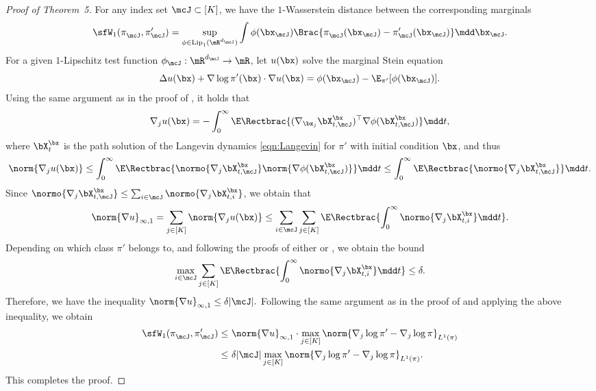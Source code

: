 \documentclass[11pt]{article}
\newcommand{\Lip}{{\rm Lip}}
\begin{document}
\begin{proof}[Proof of Theorem~5]
For any index set $\mcJ\subset [K]$, we have the $1$-Wasserstein distance between the corresponding marginals
\begin{equation}
    \sfW_1(\pi_\mcJ^{},\pi_\mcJ') = \sup_{\phi \in \Lip_1(\mR^{d_\mcJ})} \int \phi(\bx_\mcJ) \Brac{ \pi_\mcJ^{}(\bx_\mcJ) - \pi_\mcJ' (\bx_\mcJ) } \mdd \bx_\mcJ.
\end{equation}
For a given $1$-Lipschitz test function $\phi_\mcJ : \mR^{d_\mcJ} \rightarrow \mR$, let $u(\bx)$ solve the marginal Stein equation
\begin{equation}
    \Delta u(\bx) + \nabla \log \pi' (\bx) \cdot \nabla u(\bx) = \phi(\bx_\mcJ) - \E_{\pi'} [\phi(\bx_\mcJ)].  
\end{equation}
Using the same argument as in the proof of , it holds that
\begin{equation} 
    \nabla_j u(\bx) = - \int_0^\infty \E \Rectbrac{ (\nabla_{\bx_j} \bX_{t,\mcJ}^\bx)^\top \nabla \phi (\bX_{t,\mcJ}^\bx) } \mdd t,
\end{equation}
where $\bX_t^\bx$ is the path solution of the Langevin dynamics \eqref{eqn:Langevin} for $\pi'$ with initial condition $\bx$, and thus
\begin{equation}
    \norm{ \nabla_j u(\bx) } \le \int_0^\infty \E \Rectbrac{ \normo{ \nabla_j \bX_{t,\mcJ}^\bx } \norm{ \nabla \phi (\bX_{t,\mcJ}^\bx) }  } \mdd t \le \int_0^\infty \E \Rectbrac{ \normo{ \nabla_j \bX_{t,\mcJ}^\bx } } \mdd t.
\end{equation}
%
Since $\normo{ \nabla_j \bX_{t,\mcJ}^\bx } \le \sum_{i\in \mcJ} \normo{ \nabla_j \bX_{t,i}^\bx }$, we obtain that 
\begin{equation}
    \norm{\nabla u}_{\infty,1} = \sum_{j\in[K]} \norm{ \nabla_j u(\bx) } \le \sum_{i\in\mcJ} \sum_{j\in [K]} \E \Rectbrac{ \int_0^\infty \normo{ \nabla_j \bX_{t,i}^\bx } \mdd t }.
\end{equation}
%
Depending on which class $\pi'$ belongs to, and following the proofs of either  or , we obtain the bound
\begin{equation}
    \max_{i\in \mcJ} \sum_{j\in [K]} \E \Rectbrac{ \int_0^\infty \normo{ \nabla_j \bX_{t,i}^\bx } \mdd t } \le \delta.
\end{equation}
Therefore, we have the inequality
\(
\norm{\nabla u}_{\infty,1} \le \delta |\mcJ|.
\)
Following the same argument as in the proof of  and applying the above inequality, we obtain 
\begin{equation}
\begin{split}
    \sfW_1(\pi_\mcJ^{},\pi_\mcJ') \le~& \norm{\nabla u}_{\infty,1} \cdot \max_{j \in [K]} \norm{ \nabla_j \log \pi' - \nabla_j \log \pi }_{L^1(\pi)} \\
    \le~& \delta |\mcJ|  \max_{j \in [K]} \norm{ \nabla_j \log \pi' - \nabla_j \log \pi }_{L^1(\pi)}.
\end{split}
\end{equation}
This completes the proof. 
\end{proof}
\end{document}
